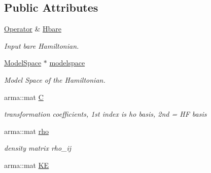 \subsection*{Public Attributes}
\begin{DoxyCompactItemize}
\item 
\hyperlink{classOperator}{Operator} \& \hyperlink{classHartreeFock_aad1a5eeadedf9689bbfc2e3d71b60aee}{Hbare}\hypertarget{classHartreeFock_aad1a5eeadedf9689bbfc2e3d71b60aee}{}\label{classHartreeFock_aad1a5eeadedf9689bbfc2e3d71b60aee}

\begin{DoxyCompactList}\small\item\em Input bare Hamiltonian. \end{DoxyCompactList}\item 
\hyperlink{classModelSpace}{Model\+Space} $\ast$ \hyperlink{classHartreeFock_a5d4a6814a338d7e4c17575ac74763f30}{modelspace}\hypertarget{classHartreeFock_a5d4a6814a338d7e4c17575ac74763f30}{}\label{classHartreeFock_a5d4a6814a338d7e4c17575ac74763f30}

\begin{DoxyCompactList}\small\item\em Model Space of the Hamiltonian. \end{DoxyCompactList}\item 
arma\+::mat \hyperlink{classHartreeFock_a9c73247cdb9255cebabaacc99ec55086}{C}\hypertarget{classHartreeFock_a9c73247cdb9255cebabaacc99ec55086}{}\label{classHartreeFock_a9c73247cdb9255cebabaacc99ec55086}

\begin{DoxyCompactList}\small\item\em transformation coefficients, 1st index is ho basis, 2nd = HF basis \end{DoxyCompactList}\item 
arma\+::mat \hyperlink{classHartreeFock_a6fc0aa9f25640979d5188443a19aeea5}{rho}\hypertarget{classHartreeFock_a6fc0aa9f25640979d5188443a19aeea5}{}\label{classHartreeFock_a6fc0aa9f25640979d5188443a19aeea5}

\begin{DoxyCompactList}\small\item\em density matrix rho\+\_\+ij \end{DoxyCompactList}\item 
arma\+::mat \hyperlink{classHartreeFock_aa30fe3bd6fa480cc21b85a830013c9fe}{KE}\hypertarget{classHartreeFock_aa30fe3bd6fa480cc21b85a830013c9fe}{}\label{classHartreeFock_aa30fe3bd6fa480cc21b85a830013c9fe}


\end{DoxyCompactItemize}

